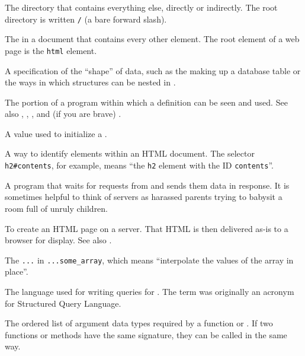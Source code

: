 \begin{description}
The directory that contains everything else, directly or indirectly. The root
directory is written \texttt{/} (a bare forward slash).

The  in a document that contains every other element.
The root element of a web page is the \texttt{html} element.

A specification of the ``shape'' of data, such as the  making
up a database table or the ways in which structures can be nested in
.

The portion of a program within which a definition can be seen and used.
See also ,
,
, and (if you are brave)
.

A value used to initialize a .

A way to identify elements within an HTML document. The selector
\texttt{h2\#contents}, for example, means ``the \texttt{h2} element with the ID \texttt{contents}''.

A program that waits for requests from  and sends them
data in response. It is sometimes helpful to think of servers as harassed
parents trying to babysit a room full of unruly children.

To create an HTML page on a server. That HTML is then delivered as-is to a
browser for display. See also .

The \texttt{...} in \texttt{...some\_array},
which means ``interpolate the values of the array in place''.

The language used for writing queries for . The term was originally an acronym for
Structured Query Language.

The ordered list of argument data types required by a function or
. If two functions or methods have the same signature,
they can be called in the same way.


\end{description}
